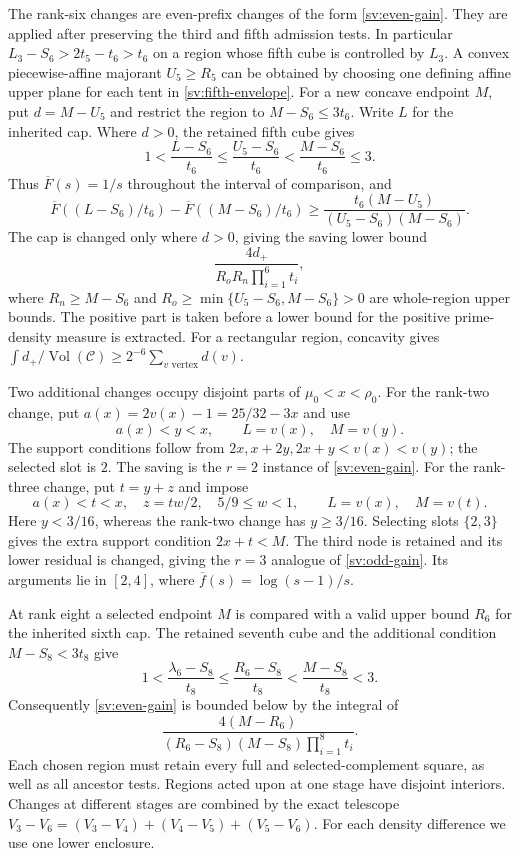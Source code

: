 The rank-six changes are even-prefix changes of the form
\eqref{sv:even-gain}.  They are applied after preserving the third
and fifth admission tests.  In particular
$L_3-S_6>2t_5-t_6>t_6$ on a region whose fifth cube is controlled by
$L_3$.  A convex piecewise-affine majorant $U_5\ge R_5$ can be obtained by
choosing one defining affine upper plane for each tent in
\eqref{sv:fifth-envelope}.  For a new concave endpoint $M$, put
$d=M-U_5$ and restrict the region to $M-S_6\le3t_6$.
Write $L$ for the inherited cap.  Where $d>0$, the retained fifth
cube gives
\[
 1<\frac{L-S_6}{t_6}\le\frac{U_5-S_6}{t_6}
       <\frac{M-S_6}{t_6}\le3.
\]
Thus $\overline F(s)=1/s$ throughout the interval of comparison, and
\[
 \overline F((L-S_6)/t_6)-\overline F((M-S_6)/t_6)
 \ge \frac{t_6(M-U_5)}{(U_5-S_6)(M-S_6)}.
\]
The cap is changed only where $d>0$, giving the saving lower bound
\begin{equation}\label{sv:sixth-lower}
 \frac{4d_+}{R_oR_n\prod_{i=1}^6t_i},
\end{equation}
where $R_n\ge M-S_6$ and
$R_o\ge\min\{U_5-S_6,M-S_6\}>0$ are whole-region upper bounds.
The positive part is taken before a lower bound for the positive
prime-density measure is extracted.  For a rectangular region,
concavity gives
$\int d_+/\operatorname{Vol}(\mathcal C)
\ge 2^{-6}\sum_{v\text{ vertex}}d(v)$.

Two additional changes occupy disjoint parts of $\mu_0<x<\rho_0$.
For the rank-two change, put $a(x)=2v(x)-1=25/32-3x$ and use
\[
 a(x)<y<x,\qquad L=v(x),\quad M=v(y).
\]
The support conditions follow from
$2x,x+2y,2x+y< v(x)<v(y)$; the selected slot is $2$.
The saving is the $r=2$ instance of \eqref{sv:even-gain}.
For the rank-three change, put $t=y+z$ and impose
\[
 a(x)<t<x,\quad z=tw/2,\quad 5/9\le w<1,
 \qquad L=v(x),\quad M=v(t).
\]
Here $y<3/16$, whereas the rank-two change has $y\ge3/16$.
Selecting slots $\{2,3\}$ gives the extra support condition $2x+t<M$.
The third node is retained and its lower residual is changed, giving
the $r=3$ analogue of \eqref{sv:odd-gain}.  Its arguments lie in
$[2,4]$, where $\overline f(s)=\log(s-1)/s$.

At rank eight a selected endpoint $M$ is compared with a valid
upper bound $R_6$ for the inherited sixth cap.  The retained seventh
cube and the additional condition $M-S_8<3t_8$ give
\begin{equation}\label{sv:eighth-range}
 1<\frac{\lambda_6-S_8}{t_8}
 \le\frac{R_6-S_8}{t_8}<\frac{M-S_8}{t_8}<3.
\end{equation}
Consequently \eqref{sv:even-gain} is bounded below by the integral of
\begin{equation}\label{sv:eighth-density}
 \frac{4(M-R_6)}{(R_6-S_8)(M-S_8)\prod_{i=1}^8t_i}.
\end{equation}
Each chosen region must retain every full and selected-complement
square, as well as all ancestor tests.  Regions acted upon at one
stage have disjoint interiors.  Changes at different stages are
combined by the exact telescope
$V_3-V_6=(V_3-V_4)+(V_4-V_5)+(V_5-V_6)$.
For each density difference we use one lower enclosure.


